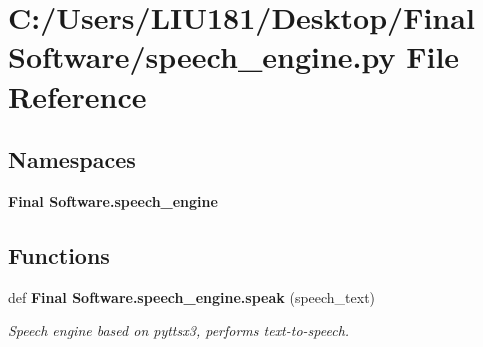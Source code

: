 \section{C\+:/\+Users/\+L\+I\+U181/\+Desktop/\+Final Software/speech\+\_\+engine.py File Reference}
\label{speech__engine_8py}
\subsection*{Namespaces}
\begin{DoxyCompactItemize}
\item 
 \textbf{ Final Software.\+speech\+\_\+engine}
\end{DoxyCompactItemize}
\subsection*{Functions}
\begin{DoxyCompactItemize}
\item 
def \textbf{ Final Software.\+speech\+\_\+engine.\+speak} (speech\+\_\+text)
\begin{DoxyCompactList}\small\item\em Speech engine based on pyttsx3, performs text-\/to-\/speech. \end{DoxyCompactList}\end{DoxyCompactItemize}
